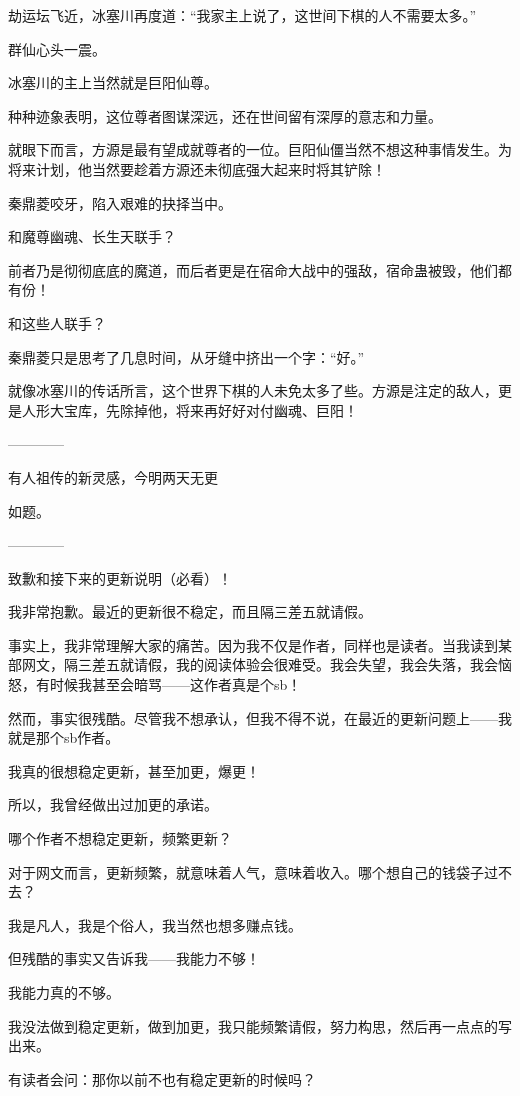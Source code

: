 \begin{this_body}
劫运坛飞近，冰塞川再度道：“我家主上说了，这世间下棋的人不需要太多。”

群仙心头一震。

冰塞川的主上当然就是巨阳仙尊。

种种迹象表明，这位尊者图谋深远，还在世间留有深厚的意志和力量。

就眼下而言，方源是最有望成就尊者的一位。巨阳仙僵当然不想这种事情发生。为将来计划，他当然要趁着方源还未彻底强大起来时将其铲除！

秦鼎菱咬牙，陷入艰难的抉择当中。

和魔尊幽魂、长生天联手？

前者乃是彻彻底底的魔道，而后者更是在宿命大战中的强敌，宿命蛊被毁，他们都有份！

和这些人联手？

秦鼎菱只是思考了几息时间，从牙缝中挤出一个字：“好。”

就像冰塞川的传话所言，这个世界下棋的人未免太多了些。方源是注定的敌人，更是人形大宝库，先除掉他，将来再好好对付幽魂、巨阳！

------------

有人祖传的新灵感，今明两天无更

如题。

------------

致歉和接下来的更新说明（必看）！

我非常抱歉。最近的更新很不稳定，而且隔三差五就请假。

事实上，我非常理解大家的痛苦。因为我不仅是作者，同样也是读者。当我读到某部网文，隔三差五就请假，我的阅读体验会很难受。我会失望，我会失落，我会恼怒，有时候我甚至会暗骂——这作者真是个sb！

然而，事实很残酷。尽管我不想承认，但我不得不说，在最近的更新问题上——我就是那个sb作者。

我真的很想稳定更新，甚至加更，爆更！

所以，我曾经做出过加更的承诺。

哪个作者不想稳定更新，频繁更新？

对于网文而言，更新频繁，就意味着人气，意味着收入。哪个想自己的钱袋子过不去？

我是凡人，我是个俗人，我当然也想多赚点钱。

但残酷的事实又告诉我——我能力不够！

我能力真的不够。

我没法做到稳定更新，做到加更，我只能频繁请假，努力构思，然后再一点点的写出来。

有读者会问：那你以前不也有稳定更新的时候吗？


\end{this_body}
